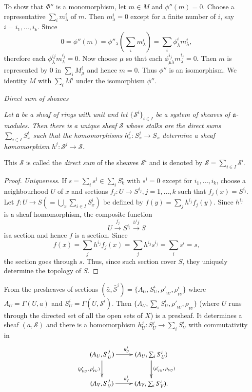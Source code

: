 To show that $\Phi''$ is a monomorphism, let $m \in M$ and 
$\phi''(m)=0$. Choose a representative $\sum_i m^i_\lambda$ of
$m$. Then $m^i_\lambda=0$ except for a finite number of $i$, say
$i=i_1, \ldots,i_k$. Since  
 $$
0=\phi''(m)=\phi''_\lambda (\sum_i m^i_\lambda)=\sum _i \phi^i_\lambda
m^i_\lambda,  
$$
therefore each $\phi^{ij}_\lambda m^{i_j}_\lambda =0$. Now choose 
$\mu$ so that each $\phi^{i_j}_{\mu \lambda}m^{i_j}_\lambda =0$. Then
$m$ is represented by 0 in $\sum_i M^i_\mu$ and hence $m=0$. Thus
$\phi''$ is an isomorphism. We identity $M$ with $\sum_i M^i$ under the
isomorphism $\phi''$. 

\medskip
\noindent\textit{Direct sum of sheaves}

\textit{Let $\mathfrak{a}$ be a sheaf of rings with unit and let $\{ 
  \mathscr{S}^i \}_{i \in I}$ be a system of sheaves of
  $\mathfrak{a}$-modules. Then there is a unique sheaf $\mathscr{S}$
  whose stalks are the direct sums $\sum\limits_{i \in I}S^i_x$ such
  that the homomorphisms $h^j_x:S^j_x\to S_x$ determine a sheaf
  homomorphism $h^j:\mathscr{S}^j \to \mathscr{S}$.} 

This $\mathscr{S}$ is called the \textit{direct sum} of the sheaves  
$\mathscr{S}^i$ and is denoted by $\mathscr{S}=\sum \limits_{i \in
  I}\mathscr{S}^i$. 

\begin{proof}
{\em Uniqueness}. If $s=\sum_i s^i \in \sum_iS^i_k$ with $s^i=0$
except for $i_1, \ldots, i_k$, choose a neighbourhood $U$ of $x$ and
sections $f_j:U \to S^{i_j}, j=1, \ldots ,k$ such that
$f_j(x)=S^{i_j}$. Let $f:U \to S(=\bigcup \limits_x \sum \limits_{i
  \in I} S^i_x)$ be defined by $f(y)=\sum_jh^{i_j}f_j(y)$. Since
$h^{i_j}$ is a sheaf homomorphism, the composite function 
$$
U \xrightarrow {f_j}S^{i_j} \xrightarrow{h^ij}S 
$$
is\pageoriginale a section and hence $f$ is a section. Since
$$
f(x)=\sum_j h^{i_j} f_j(x)=\sum _j h^{i_j}s^{i_j}=\sum_i s^i=s,  
$$
the section goes through $s$. Thus, since such section cover $S$, they 
uniquely determine the topology of $S$. 
\end{proof}

\medskip
{}
From the presheaves of sections 
$(\bar{a},\bar{\mathscr{S}}^i)=\{A_U,S^i_U, \rho'_{_{VU}},\rho_{_{VU}}^i \}$
where $A_U= \Gamma (U,a)$ and $S^i_U=\Gamma (U,\mathscr{S}^i)$. Then 
$\{ A_U,\sum_i S^i_U, \rho'_{_{VU}},\rho_{_{VU}} \}$ (where $U$ runs through
the directed set of all the open sets of $X$) is a presheaf. It
determines a sheaf $(a,\mathscr{S})$ and there is a homomorphism
$h^j_U:S^j_U \to \sum _i S^i_U$ with commutativity in  
\[
\xymatrix{
(A_U, S^j_U) \ar[r]^{h^j_U}\ar[d]_{(\rho'_{_{VU}}, \; \rho^j_{_{VU}})} & (A_U,
  \sum_i S^i_U) \ar[d]^{(\rho'_{_{VU}}, \; \rho_{_{VU}})}\\
(A_V,S^j_V) \ar[r]^{h^j_V} & (A_V, \sum_i S^i_V).
}
\]\pageoriginale

